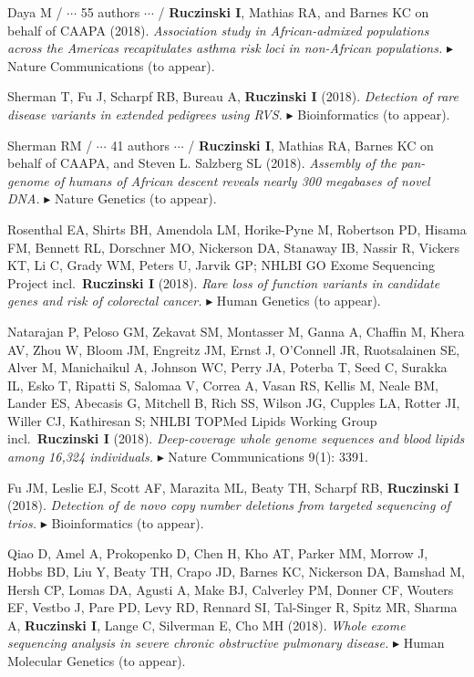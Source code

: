 \documentclass[10pt]{article}
\newcommand{\mine}{
  \addtocounter{enumi}{1}
\item[\fcolorbox{white}{grey}{\color{white} \tiny \arabic{enumi}}]
}
\newcommand{\dg}[1]{{\color{black} $\blacktriangleright$ {#1}}}
\begin{document}
\item 
Daya M / $\cdots$ 55 authors $\cdots$ / {\bf Ruczinski I}, Mathias RA, and Barnes KC on behalf of CAAPA (2018).
{\it Association study in African-admixed populations across the Americas recapitulates asthma risk loci in non-African populations.} 
\dg{Nature Communications (to appear).}
\mine 
Sherman T, Fu J, Scharpf RB, Bureau A, {\bf Ruczinski I} (2018).
{\it Detection of rare disease variants in extended pedigrees using RVS.}
\dg{Bioinformatics (to appear).}
\item 
Sherman RM / $\cdots$ 41 authors $\cdots$ / {\bf Ruczinski I}, Mathias RA, Barnes KC on behalf of CAAPA, and Steven L. Salzberg SL (2018).
{\it Assembly of the pan-genome of humans of African descent reveals nearly 300 megabases of novel DNA.}
\dg{Nature Genetics (to appear).}
\item
Rosenthal EA, Shirts BH, Amendola LM, Horike-Pyne M, Robertson PD, Hisama FM, Bennett RL, Dorschner MO, Nickerson DA, Stanaway IB, Nassir R, Vickers KT, Li C, Grady WM, Peters U, Jarvik GP; NHLBI GO Exome Sequencing Project incl.~{\bf Ruczinski I} (2018).
{\it Rare loss of function variants in candidate genes and risk of colorectal cancer.}
\dg{Human Genetics (to appear).}
\item
Natarajan P, Peloso GM, Zekavat SM, Montasser M, Ganna A, Chaffin M, Khera AV, Zhou W, Bloom JM, Engreitz JM, Ernst J, O'Connell JR, Ruotsalainen SE, Alver M, Manichaikul A, Johnson WC, Perry JA, Poterba T, Seed C, Surakka IL, Esko T, Ripatti S, Salomaa V, Correa A, Vasan RS, Kellis M, Neale BM, Lander ES, Abecasis G, Mitchell B, Rich SS, Wilson JG, Cupples LA, Rotter JI, Willer CJ, Kathiresan S; NHLBI TOPMed Lipids Working Group incl.~{\bf Ruczinski I} (2018).
{\it Deep-coverage whole genome sequences and blood lipids among 16,324 individuals.}
\dg{Nature Communications 9(1): 3391.}
\mine 
Fu JM, Leslie EJ, Scott AF, Marazita ML, Beaty TH, Scharpf RB, {\bf Ruczinski I} (2018).
{\it Detection of de novo copy number deletions from targeted sequencing of trios.}
\dg{Bioinformatics (to appear).}
\item 
Qiao D, Amel A, Prokopenko D, Chen H, Kho AT, Parker MM, Morrow J, Hobbs BD, Liu Y, Beaty TH, Crapo JD, Barnes KC, Nickerson DA, Bamshad M, Hersh CP, Lomas DA, Agusti A, Make BJ, Calverley PM, Donner CF, Wouters EF, Vestbo J, Pare PD, Levy RD, Rennard SI, Tal-Singer R, Spitz MR, Sharma A, {\bf Ruczinski I}, Lange C, Silverman E, Cho MH (2018).
{\it Whole exome sequencing analysis in severe chronic obstructive pulmonary disease.}
\dg{Human Molecular Genetics (to appear).}
\end{document}
